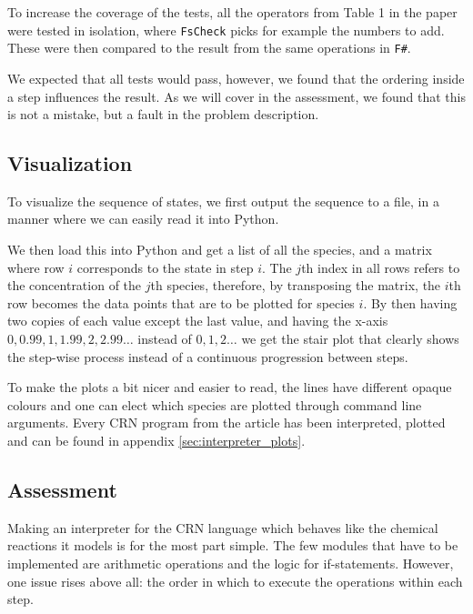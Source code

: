 To increase the coverage of the tests, all the operators from Table 1 in the paper were tested in isolation, where \texttt{FsCheck} picks for example the numbers to add. These were then compared to the result from the same operations in \texttt{F\#}.


We expected that all tests would pass, however, we found that the ordering inside a step influences the result. As we will cover in the assessment, we found that this is not a mistake, but a fault in the problem description.

\subsection{Visualization}
To visualize the sequence of states, we first output the sequence to a file, in a manner where we can easily read it into Python.

We then load this into Python and get a list of all the species, and a matrix where row $i$ corresponds to the state in step $i$. The $j$th index in all rows refers to the concentration of the $j$th species, therefore, by transposing the matrix, the $i$th row becomes the data points that are to be plotted for species $i$. By then having two copies of each value except the last value, and having the x-axis $0,0.99,1,1.99,2,2.99\dots$ instead of $0,1,2\dots$ we get the stair plot that clearly shows the step-wise process instead of a continuous progression between steps.

To make the plots a bit nicer and easier to read, the lines have different opaque colours and one can elect which species are plotted through command line arguments. Every CRN program from the article has been interpreted, plotted and can be found in appendix \ref{sec:interpreter_plots}. 

\subsection{Assessment}
Making an interpreter for the CRN language which behaves like the chemical reactions it models is for the most part simple. The few modules that have to be implemented are arithmetic operations and the logic for if-statements. However, one issue rises above all: the order in which to execute the operations within each step. 

